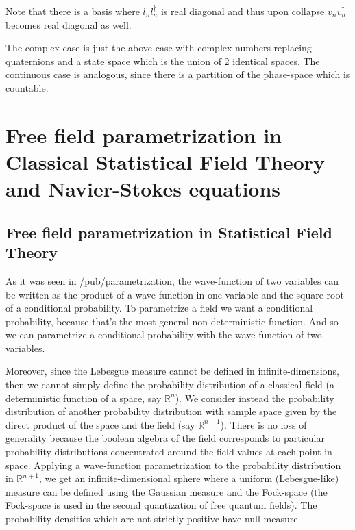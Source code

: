 \documentclass[11pt]{book}
\begin{document}
Note that there is a basis where \(l_nl_n^\dagger\) is real diagonal and
thus upon collapse \(v_nv_n^\dagger\) becomes real diagonal as well.

The complex case is just the above case with complex numbers replacing
quaternions and a state space which is the union of 2 identical spaces.
The continuous case is analogous, since there is a partition of the
phase-space which is countable.

\chapter{Free field parametrization in Classical Statistical Field Theory and Navier-Stokes equations}
\hypertarget{free-field-parametrization-in-statistical-field-theory}{%
\section{Free field parametrization in Statistical Field
Theory}\label{free-field-parametrization-in-statistical-field-theory}}

As it was seen in
\href{https://timepiece.pubpub.org/pub/parametrization}{/pub/parametrization},
the wave-function of two variables can be written as the product of a
wave-function in one variable and the square root of a conditional
probability. To parametrize a field we want a conditional probability,
because that's the most general non-deterministic function. And so we
can parametrize a conditional probability with the wave-function of two
variables.

Moreover, since the Lebesgue measure cannot be defined in
infinite-dimensions\cite{Baker1991ux201cLebesgue}\cite{Baker2004ux201cLebesgue},
then we cannot simply define the probability distribution of a classical
field (a deterministic function of a space, say \(\mathbb{R}^n \)). We
consider instead the probability distribution of another probability
distribution with sample space given by the direct product of the space
and the field (say \(\mathbb{R}^{n+1}\)). There is no loss of generality
because the boolean algebra of the field corresponds to particular
probability distributions concentrated around the field values at each
point in space. Applying a wave-function parametrization to the
probability distribution in \(\mathbb{R}^{n+1}\), we get an
infinite-dimensional sphere where a uniform (Lebesgue-like) measure can
be defined using the Gaussian measure and the Fock-space (the Fock-space
is used in the second quantization of free quantum
fields)\cite{Peterson2019GaussianLA}.
The probability densities which are not strictly positive have null
measure.
\end{document}
